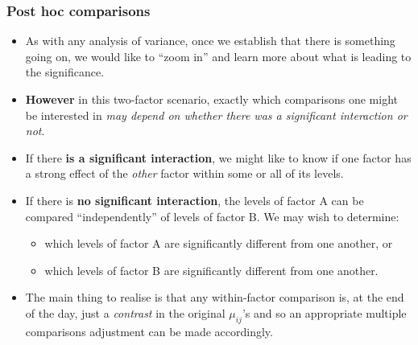 \documentclass[a4paper]{article}
\begin{document}
\subsubsection{Post hoc comparisons}
\begin{itemize}
	\item As with any analysis of variance, once we establish that there is something going on, we would like to ``zoom in'' and learn more about what is leading to the significance.
	\item \textbf{However} in this two-factor scenario, exactly which comparisons one might be interested in \textit{may depend on whether there was a significant interaction or not}.
	\item If there \textbf{is a significant interaction}, we might like to know if one factor has a strong effect of the \textit{other} factor within some or all of its levels.
	\item If there is \textbf{no significant interaction}, the levels of factor A can be compared ``independently'' of levels of factor B. We may wish to determine:
	\begin{itemize}
		\item which levels of factor A are significantly different from one another, or
		\item which levels of factor B are significantly different from one another.
	\end{itemize}
	\item The main thing to realise is that any within-factor comparison is, at the end of the day, just a \textit{contrast} in the original \( \mu_{ij} \)'s and so an appropriate multiple comparisons adjustment can be made accordingly.
\end{itemize}
\end{document}
